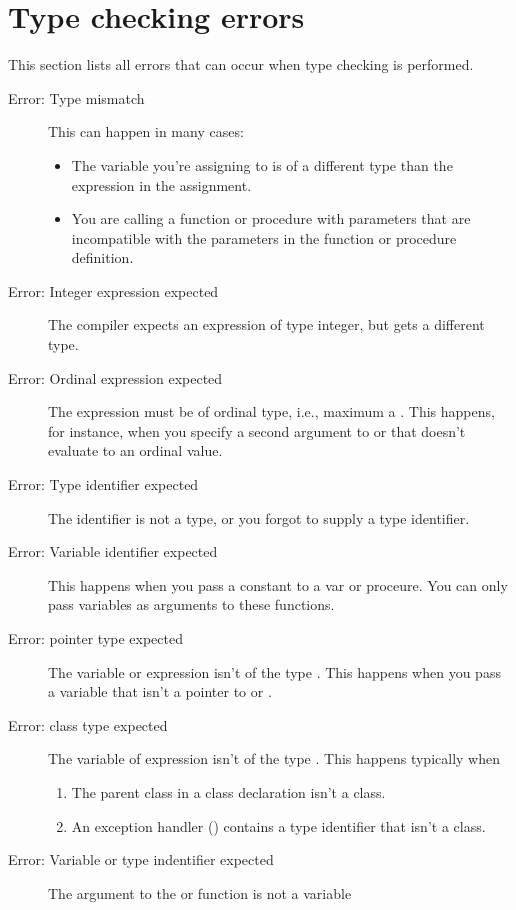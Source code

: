  \section{Type checking errors}
 This section lists all errors that can occur when type checking is
 performed.
 \begin{description}
\item [Error: Type mismatch]
 This can happen in many cases:
 \begin{itemize}
 \item The variable you're assigning to is of a different type than the
 expression in the assignment.
 \item You are calling a function or procedure with parameters that are 
 incompatible with the parameters in the function or procedure definition.
 \end{itemize}
\item [Error: Integer expression expected]
 The compiler expects an expression of type integer, but gets a different
 type.
\item [Error: Ordinal expression expected]
 The expression must be of ordinal type, i.e., maximum a .
 This happens, for instance, when you specify a second argument
 to  or  that doesn't evaluate to an ordinal value.
\item [Error: Type identifier expected]
 The identifier is not a type, or you forgot to supply a type identifier.
\item [Error: Variable identifier expected]
 This happens when you pass a constant to a  var or 
 proceure. You can only pass variables as arguments to these functions.
\item [Error: pointer type expected]
 The variable or expression isn't of the type . This
 happens when you pass a variable that isn't a pointer to 
 or .
\item [Error: class type expected]
 The variable of expression isn't of the type . This happens
 typically when
 \begin{enumerate} 
 \item The parent class in a class declaration isn't a class.
 \item An exception handler () contains a type identifier that 
 isn't a class.
 \end{enumerate}
\item [Error: Variable or type indentifier expected]
 The argument to the  or  function is not a variable

\end{description}
